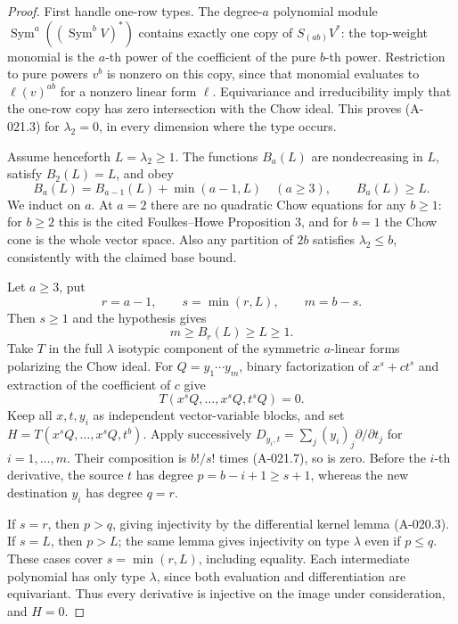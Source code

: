 \begin{proof}
First handle one-row types. The degree-$a$ polynomial module
$\operatorname{Sym}^a((\operatorname{Sym}^b V)^*)$ contains
exactly one copy of $S_{(ab)}V^*$: the top-weight monomial is
the $a$-th power of the coefficient of the pure $b$-th power.
Restriction to pure powers $v^b$ is nonzero on this copy, since
that monomial evaluates to $\ell(v)^{ab}$ for a nonzero linear
form $\ell$. Equivariance and irreducibility imply that the
one-row copy has zero intersection with the Chow ideal. This
proves (A-021.3) for $\lambda_2=0$, in every dimension where
the type occurs.

Assume henceforth $L=\lambda_2\geq1$. The functions $B_a(L)$
are nondecreasing in $L$, satisfy $B_2(L)=L$, and obey
\[
 B_a(L)=B_{a-1}(L)+\min(a-1,L)\quad(a\geq3),
 \qquad B_a(L)\geq L.                                 \tag{A-021.5}
\]
We induct on $a$. At $a=2$ there are no quadratic Chow
equations for any $b\geq1$: for $b\geq2$ this is the cited
Foulkes--Howe Proposition 3, and for $b=1$ the Chow cone is
the whole vector space. Also any partition of $2b$ satisfies
$\lambda_2\leq b$, consistently with the claimed base bound.

Let $a\geq3$, put
\[
 r=a-1,\qquad s=\min(r,L),\qquad m=b-s.
\]
Then $s\geq1$ and the hypothesis gives
\[
                   m\geq B_r(L)\geq L\geq1.            \tag{A-021.6}
\]
Take $T$ in the full $\lambda$ isotypic component of the
symmetric $a$-linear forms polarizing the Chow ideal.
For $Q=y_1\cdots y_m$, binary factorization of
$x^s+ct^s$ and extraction of the coefficient of $c$ give
\[
                     T(x^sQ,\ldots,x^sQ,t^sQ)=0.       \tag{A-021.7}
\]
Keep all $x,t,y_i$ as independent vector-variable blocks, and
set $H=T(x^sQ,\ldots,x^sQ,t^b)$. Apply successively
$D_{y_i,t}=\sum_j(y_i)_j\partial/\partial t_j$ for
$i=1,\ldots,m$. Their composition is $b!/s!$ times
(A-021.7), so is zero. Before the $i$-th derivative, the
source $t$ has degree $p=b-i+1\geq s+1$, whereas the new
destination $y_i$ has degree $q=r$.

If $s=r$, then $p>q$, giving injectivity by the differential
kernel lemma (A-020.3). If $s=L$, then $p>L$; the same lemma
gives injectivity on type $\lambda$ even if $p\leq q$.
These cases cover $s=\min(r,L)$, including equality. Each
intermediate polynomial has only type $\lambda$, since both
evaluation and differentiation are equivariant. Thus every
derivative is injective on the image under consideration, and
$H=0$.


\end{proof}

